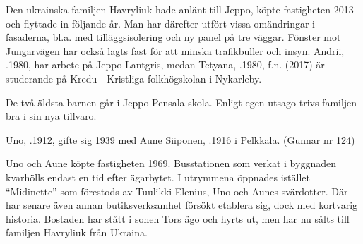%


%
Den ukrainska familjen Havryliuk hade anlänt till Jeppo, köpte fastigheten 2013 och flyttade in följande år. Man har därefter utfört vissa omändringar i fasaderna, bl.a. med tilläggsisolering och ny panel på tre väggar. Fönster mot Jungarvägen har också lagts fast för att minska trafikbuller och insyn. Andrii, .1980, har arbete på Jeppo Lantgris, medan Tetyana, .1980, f.n. (2017) är studerande på Kredu - Kristliga folkhögskolan i Nykarleby.
\begin{jhchildren}
  \item {}
  \item {}
  \item {}
\end{jhchildren}
De två äldsta barnen går i Jeppo-Pensala skola. Enligt egen utsago trivs familjen bra i sin nya tillvaro.


%
Uno, .1912, gifte sig 1939 med Aune Siiponen, .1916 i Pelkkala. (Gunnar nr 124)
\begin{jhchildren}
  \item {}
  \item {}
  \item {}
  \item {}
\end{jhchildren}
Uno och Aune köpte fastigheten 1969. Busstationen som verkat i byggnaden kvarhölls endast en tid efter ägarbytet. I utrymmena öppnades istället  ``Midinette'' som förestods av Tuulikki Elenius, Uno och Aunes svärdotter. Där har senare även annan butiksverksamhet försökt etablera sig, dock med kortvarig historia. Bostaden har stått i sonen Tors ägo och hyrts ut, men har nu sålts till familjen Havryliuk från Ukraina.

